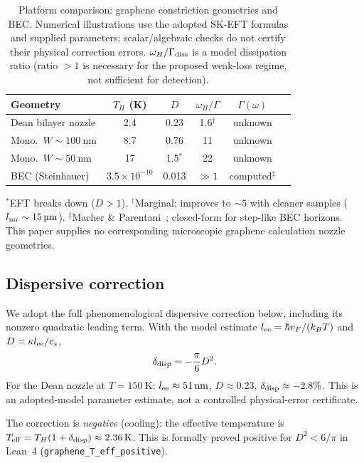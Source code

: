 \documentclass[aps,prd,twocolumn,showpacs,superscriptaddress,nofootinbib]{revtex4-2}
\begin{document}
\begin{table}[t]
\caption{Platform comparison: graphene constriction geometries and BEC.
Numerical illustrations use the adopted SK-EFT formulas and supplied
parameters; scalar/algebraic checks do not certify their physical correction
errors. $\omega_H/\Gamma_{\rm diss}$ is a model dissipation ratio (ratio $>1$
is necessary for the proposed weak-loss regime, not sufficient for detection).}
\label{tab:platforms}
\begin{ruledtabular}
\begin{tabular}{lccccc}
Geometry & $T_H$ (K) & $D$ & $\omega_H/\Gamma$ & $\Gamma(\omega)$ \\
\hline
Dean bilayer nozzle & 2.4 & 0.23 & 1.6$^\dagger$ & unknown \\
Mono.\ $W{\sim}\SI{100}{\nano\meter}$ & 8.7 & 0.76 & 11 & unknown \\
Mono.\ $W{\sim}\SI{50}{\nano\meter}$ & 17 & 1.5$^*$ & 22 & unknown \\
BEC (Steinhauer) & $3.5{\times}10^{-10}$ & 0.013 & $\gg 1$ & computed$^\ddagger$ \\
\end{tabular}
\end{ruledtabular}
{\footnotesize $^*$EFT breaks down ($D > 1$).
$^\dagger$Marginal; improves to ${\sim}5$ with cleaner samples
($l_{\rm mr} \sim \SI{15}{\micro\meter}$).
$^\ddagger$Macher \& Parentani~\cite{CoutantParentani2010}; closed-form
for step-like BEC horizons. This paper supplies no corresponding microscopic graphene calculation
nozzle geometries.}
\end{table}

\subsection{Dispersive correction}

We adopt the full phenomenological dispersive correction below,
including its nonzero quadratic leading term. With the model estimate
$l_{\rm ee}=\hbar v_F/(k_BT)$ and $D=\kappa l_{\rm ee}/c_s$,
\begin{equation}
\delta_{\rm disp} = -\frac{\pi}{6} D^2.
\label{eq:delta_disp}
\end{equation}
For the Dean nozzle at $T = \SI{150}{\kelvin}$: $l_{\rm ee} \approx
\SI{51}{\nano\meter}$, $D \approx 0.23$, $\delta_{\rm disp} \approx -2.8\%$.
This is an adopted-model parameter estimate, not a controlled physical-error certificate.

The correction is \emph{negative} (cooling): the effective temperature is
$T_{\rm eff} = T_H(1 + \delta_{\rm disp}) \approx \SI{2.36}{\kelvin}$.
This is formally proved positive for $D^2 < 6/\pi$ in Lean~4
(\texttt{graphene\_T\_eff\_positive}).
\end{document}
